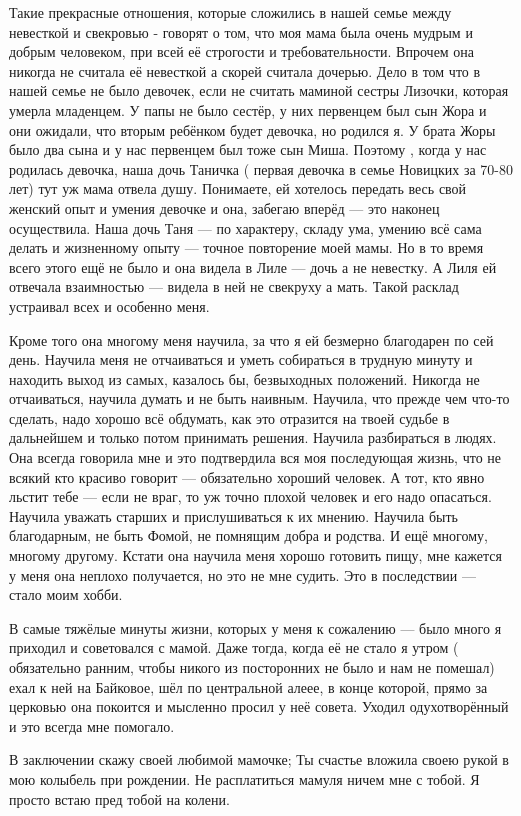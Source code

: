 Такие прекрасные отношения, которые сложились в нашей
семье   между невесткой и свекровью  - говорят о том, что моя мама  была  очень
мудрым и добрым человеком, при всей её строгости и требовательности. Впрочем
она никогда не считала её невесткой а скорей считала дочерью. Дело в том что в
нашей семье не было девочек, если не считать маминой сестры Лизочки, которая
умерла младенцем. У папы не было сестёр, у них первенцем  был сын  Жора и они
ожидали, что   вторым ребёнком  будет  девочка, но родился я. У брата Жоры было
два сына и у нас первенцем был  тоже сын Миша. Поэтому , когда у нас  родилась
девочка, наша дочь Таничка ( первая девочка  в семье Новицких  за  70-80 лет)
тут уж мама отвела душу. Понимаете, ей хотелось передать весь свой женский опыт
и умения  девочке  и она, забегаю вперёд — это наконец осуществила. Наша дочь
Таня — по характеру, складу ума,  умению всё сама делать и  жизненному опыту —
точное повторение моей мамы. Но в то время всего этого ещё  не было и она
видела в Лиле — дочь а не невестку. А Лиля ей отвечала взаимностью — видела в
ней не свекруху а мать.  Такой расклад устраивал всех и особенно меня.

Кроме того она многому меня научила, за что я ей безмерно благодарен по сей
день.  Научила меня не отчаиваться и уметь собираться в трудную минуту и
находить выход из самых, казалось бы, безвыходных положений. Никогда не
отчаиваться, научила думать и не быть наивным. Научила, что прежде  чем что-то
сделать, надо хорошо всё обдумать, как это отразится на  твоей судьбе в
дальнейшем и только потом принимать решения.  Научила разбираться в людях. Она
всегда говорила мне и это подтвердила вся моя последующая  жизнь, что не всякий
кто красиво говорит — обязательно хороший человек. А тот, кто явно льстит тебе
—  если не враг, то уж   точно плохой человек и его надо опасаться. Научила
уважать старших и прислушиваться к их мнению. Научила быть благодарным, не быть
Фомой, не помнящим  добра и родства.  И ещё многому, многому другому. Кстати
она научила меня  хорошо готовить пищу,   мне кажется у меня она неплохо
получается, но это не мне судить. Это в последствии  — стало моим хобби.

В самые тяжёлые  минуты жизни, которых у меня к сожалению — было много я
приходил и советовался с мамой. Даже тогда, когда её не стало я  утром (
обязательно ранним, чтобы никого из посторонних не было и нам не помешал) ехал
к ней  на Байковое, шёл по центральной алеее,  в конце которой, прямо за
церковью она покоится и мысленно просил у неё совета. Уходил одухотворённый и
это всегда мне помогало.

В заключении скажу своей любимой мамочке; Ты счастье вложила своею рукой в мою
колыбель при рождении. Не расплатиться мамуля  ничем мне с тобой. Я просто
встаю пред тобой на колени.

